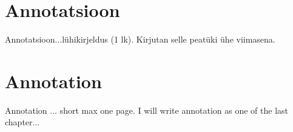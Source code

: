 \clearpage
\chapter*{Annotatsioon}
\label{annotatsioon}
\thispagestyle{empty}
Annotatsioon...lühikirjeldus (1 lk). Kirjutan selle peatüki ühe viimasena. 


\clearpage
\chapter*{Annotation}
\label{annotation}
\thispagestyle{empty}


Annotation ... short max one page. I will write annotation as one of the last chapter...
